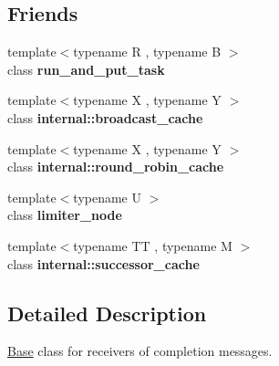 \subsection*{Friends}
\begin{DoxyCompactItemize}
\item 
\hypertarget{classtbb_1_1flow_1_1interface7_1_1continue__receiver_abaf9bf74ca5f2854d09f5f07337280eb}{}{\footnotesize template$<$typename R , typename B $>$ }\\class {\bfseries run\+\_\+and\+\_\+put\+\_\+task}\label{classtbb_1_1flow_1_1interface7_1_1continue__receiver_abaf9bf74ca5f2854d09f5f07337280eb}

\item 
\hypertarget{classtbb_1_1flow_1_1interface7_1_1continue__receiver_a1360e38efe396058978cf3754ad620f5}{}{\footnotesize template$<$typename X , typename Y $>$ }\\class {\bfseries internal\+::broadcast\+\_\+cache}\label{classtbb_1_1flow_1_1interface7_1_1continue__receiver_a1360e38efe396058978cf3754ad620f5}

\item 
\hypertarget{classtbb_1_1flow_1_1interface7_1_1continue__receiver_acbd9ac2610587a99cd7d43344297cc49}{}{\footnotesize template$<$typename X , typename Y $>$ }\\class {\bfseries internal\+::round\+\_\+robin\+\_\+cache}\label{classtbb_1_1flow_1_1interface7_1_1continue__receiver_acbd9ac2610587a99cd7d43344297cc49}

\item 
\hypertarget{classtbb_1_1flow_1_1interface7_1_1continue__receiver_a05ec930a348f7eed564236d00edbda24}{}{\footnotesize template$<$typename U $>$ }\\class {\bfseries limiter\+\_\+node}\label{classtbb_1_1flow_1_1interface7_1_1continue__receiver_a05ec930a348f7eed564236d00edbda24}

\item 
\hypertarget{classtbb_1_1flow_1_1interface7_1_1continue__receiver_a73cd25db4e6e9497940262f70f3ffc54}{}{\footnotesize template$<$typename T\+T , typename M $>$ }\\class {\bfseries internal\+::successor\+\_\+cache}\label{classtbb_1_1flow_1_1interface7_1_1continue__receiver_a73cd25db4e6e9497940262f70f3ffc54}

\end{DoxyCompactItemize}


\subsection{Detailed Description}
\hyperlink{structBase}{Base} class for receivers of completion messages. 


